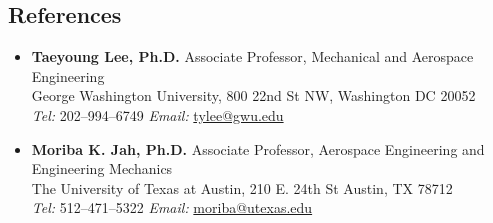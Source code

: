 \subsection*{References}
{}

\begin{itemize}
    \item[] \textbf{Taeyoung Lee, Ph.D.}
Associate Professor, Mechanical and Aerospace Engineering\\
George Washington University, 800 22nd St NW, Washington DC 20052 \\
\textit{Tel:} 202--994--6749 \hspace{1cm} \textit{Email:} \href{mailto:tylee@gwu.edu}{tylee@gwu.edu}

\item[]\textbf{Moriba K. Jah, Ph.D.}
Associate Professor, Aerospace Engineering and Engineering Mechanics \\
The University of Texas at Austin, 210 E. 24th St Austin, TX 78712 \\
\textit{Tel:} 512--471--5322 \hspace{1cm} \textit{Email:} \href{mailto:moriba@utexas.edu}{moriba@utexas.edu}
\end{itemize}
